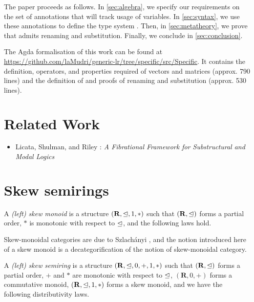 \documentclass[submission,copyright,creativecommons]{eptcs}
\begin{document}
The paper proceeds as follows.
In \autoref{sec:algebra}, we specify our requirements on the set of annotations
that will track usage of variables.
In \autoref{sec:syntax}, we use these annotations to define the type system
\name{}.
Then, in \autoref{sec:metatheory}, we prove that \name{} admits renaming and
substitution.
Finally, we conclude in \autoref{sec:conclusion}.

The Agda formalisation of this work can be found at
\url{https://github.com/laMudri/generic-lr/tree/specific/src/Specific}.
It contains the definition, operators, and properties required of vectors and
matrices (approx. 790 lines) and the definition of \name{} and proofs of
renaming and substitution (approx. 530 lines).

\section{Related Work}

\begin{itemize}
\item Licata, Shulman, and Riley \cite{LicataSR17}: \emph{A
    Fibrational Framework for Substructural and Modal Logics}
\end{itemize}

\section{Skew semirings}\label{sec:algebra}

A \emph{(left) skew monoid} is a structure $(\mathbf R, \trianglelefteq, 1, *)$ such
that $(\mathbf R, \trianglelefteq)$ forms a partial order, $*$ is monotonic with
respect to $\trianglelefteq$, and the following laws hold.

Skew-monoidal categories are due to Szlach\'anyi \cite{skew}, and the notion
introduced here of a skew monoid is a decategorification of the notion of
skew-monoidal category.

A \emph{(left) skew semiring} is a structure $(\mathbf R, \trianglelefteq, 0, +, 1, *)$
such that $(\mathbf R, \trianglelefteq)$ forms a partial order, $+$ and $*$ are
monotonic with respect to $\trianglelefteq$, $(\mathbf R, 0, +)$ forms a commutative
monoid, $(\mathbf R, \trianglelefteq, 1, *)$ forms a skew monoid, and we have the
following distributivity laws.
\end{document}
